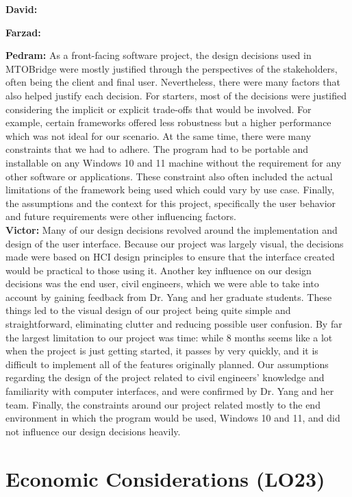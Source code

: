 \documentclass{article}
\begin{document}
\textbf{David:}

\textbf{Farzad:}

\textbf{Pedram:} As a front-facing software project, the design decisions used in MTOBridge were mostly justified through the perspectives of the stakeholders, often being the 
client and final user. Nevertheless, there were many factors that also helped justify each decision. For starters, most of the decisions were justified considering the implicit 
or explicit trade-offs that would be involved. For example, certain frameworks offered less robustness but a higher performance which was not ideal for our scenario. 
At the same time, there were many constraints that we had to adhere. The program had to be portable and installable on any Windows 10 and 11 machine without the requirement 
for any other software or applications. These constraint also often included the actual limitations of the framework being used which could vary by use case. Finally, 
the assumptions and the context for this project, specifically the user behavior and future requirements were other influencing factors.\\

\textbf{Victor:} Many of our design decisions revolved around the implementation and design of the user interface. Because our project was largely visual, the decisions made 
were based on HCI design principles to ensure that the interface created would be practical to those using it. Another key influence on our design decisions was the end user, 
civil engineers, which we were able to take into account by gaining feedback from Dr. Yang and her graduate students. These things led to the visual design of our project being 
quite simple and straightforward, eliminating clutter and reducing possible user confusion. By far the largest limitation to our project was time: while 8 months seems like a 
lot when the project is just getting started, it passes by very quickly, and it is difficult to implement all of the features originally planned. Our assumptions regarding the 
design of the project related to civil engineers' knowledge and familiarity with computer interfaces, and were confirmed by Dr. Yang and her team. Finally, the constraints 
around our project related mostly to the end environment in which the program would be used, Windows 10 and 11, and did not influence our design decisions heavily. 

\section{Economic Considerations (LO23)}
\end{document}
